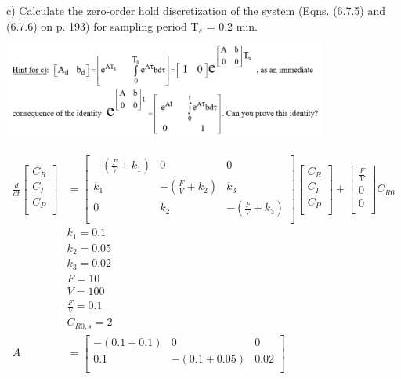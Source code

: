 \documentclass[12pt]{article}
\begin{document}
\begin{enumerate}
c) Calculate the zero-order hold discretization of the system (Eqns. (6.7.5) and (6.7.6) on p. 193) for sampling period T$_s$ = 0.2 min.

\includegraphics[width=0.8\textwidth]{assets/p4hint.png}

\begin{align*}
    \frac{d}{dt} \begin{bmatrix}
        C_R \\
        C_I \\
        C_P \\
    \end{bmatrix} &= \begin{bmatrix}
        -\left(\frac{F}{V} + k_1\right) & 0 & 0 \\
        k_1 & -\left(\frac{F}{V} + k_2\right) & k_3 \\
        0 & k_2 & -\left(\frac{F}{V} + k_3\right) \\
    \end{bmatrix} \begin{bmatrix}
        C_R \\
        C_I \\
        C_P \\
    \end{bmatrix} + \begin{bmatrix}
        \frac{F}{V} \\
        0 \\
        0 \\
    \end{bmatrix} C_{R0} \\
    & k_1 = 0.1 \\
    & k_2 = 0.05 \\
    & k_3 = 0.02 \\
    & F = 10 \\
    & V = 100 \\
    & \frac{F}{V} = 0.1 \\
    & C_{R0,s} = 2 \\
    A &= \begin{bmatrix}
        -\left(0.1 + 0.1\right) & 0 & 0 \\
        0.1 & -\left(0.1 + 0.05\right) & 0.02 \\

\end{bmatrix}
\end{align*}
\end{enumerate}
\end{document}
